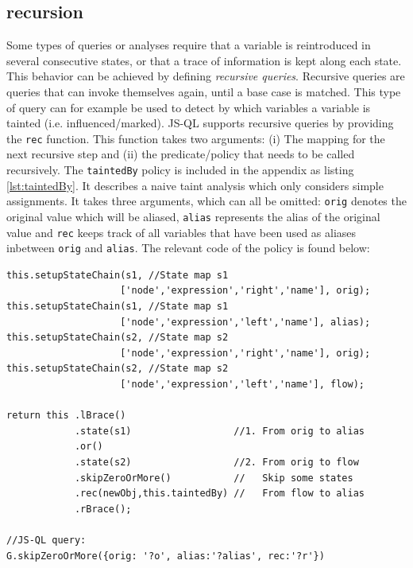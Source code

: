 \subsection{recursion}
Some types of queries or analyses require that a variable is reintroduced in several consecutive states, or that a trace of information is kept along each state. This behavior can be achieved by defining \textit{recursive queries}. Recursive queries are queries that can invoke themselves again, until a base case is matched. This type of query can for example be used to detect by which variables a variable is tainted (i.e. influenced/marked). JS-QL supports recursive queries by providing the \texttt{rec} function. This function takes two arguments: (i) The mapping for the next recursive step and (ii) the predicate/policy that needs to be called recursively. The \texttt{taintedBy} policy is included in the appendix as listing \ref{lst:taintedBy}. It describes a naive taint analysis which only considers simple assignments. It takes three arguments, which can all be omitted: \texttt{orig} denotes the original value which will be aliased, \texttt{alias} represents the alias of the original value and \texttt{rec} keeps track of all variables that have been used as aliases inbetween \texttt{orig} and \texttt{alias}. The relevant code of the policy is found below:

\begin{lstlisting}[label={lst:recursivePolicy},language=JSQL, caption=Recursive call of the \texttt{taintedBy} policy,mathescape=true]
this.setupStateChain(s1, //State map s1
                    ['node','expression','right','name'], orig); 
this.setupStateChain(s1, //State map s1
                    ['node','expression','left','name'], alias); 
this.setupStateChain(s2, //State map s2
                    ['node','expression','right','name'], orig);
this.setupStateChain(s2, //State map s2
                    ['node','expression','left','name'], flow);

return this .lBrace()
            .state(s1)                  //1. From orig to alias
            .or()
            .state(s2)                  //2. From orig to flow
            .skipZeroOrMore()           //   Skip some states
            .rec(newObj,this.taintedBy) //   From flow to alias
            .rBrace();

//JS-QL query:
G.skipZeroOrMore({orig: '?o', alias:'?alias', rec:'?r'})
\end{lstlisting}

